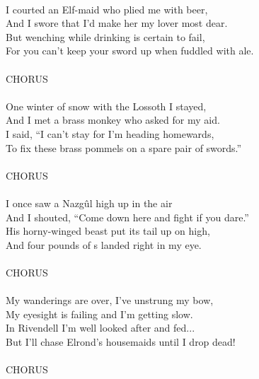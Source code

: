 \begin{multicols}{2}
\\
I courted an Elf-maid who plied me with beer,
\\
And I swore that I’d make her my lover most dear.
\\
But wenching while drinking is certain to fail,
\\
For you can’t keep your sword up when fuddled with ale.
\\
\\CHORUS\\
\\
One winter of snow with the Lossoth I stayed,
\\
And I met a brass monkey who asked for my aid.
\\
I said, “I can’t stay for I’m heading homewards,
\\
To fix these brass pommels on a spare pair of swords.”
\\
\\CHORUS\\
\\
I once saw a Nazg\^ul high up in the air
\\
And I shouted, “Come down here and fight if you dare.”
\\
His horny-winged beast put its tail up on high,
\\
And four pounds of s landed right in my eye.
\\
\\CHORUS\\
\\
My wanderings are over, I’ve unstrung my bow,
\\
My eyesight is failing and I’m getting slow.
\\
In Rivendell I’m well looked after and fed...
\\
But I’ll chase Elrond’s housemaids until I drop dead!
\\
\\CHORUS
\\
\\
\\
\end{multicols}